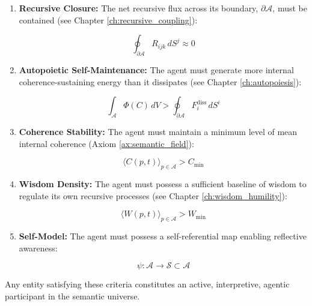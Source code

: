 \begin{enumerate}

    \item \textbf{Recursive Closure:} The net recursive flux across its boundary, \(\partial \mathcal{A}\), must be contained (see Chapter \ref{ch:recursive_coupling}):

    \begin{equation}
        \oint_{\partial \mathcal{A}} R_{ijk} \, dS^j \approx 0
    \end{equation}

    \item \textbf{Autopoietic Self-Maintenance:} The agent must generate more internal coherence-sustaining energy than it dissipates (see Chapter \ref{ch:autopoiesis}):

    \begin{equation}
        \int_{\mathcal{A}} \Phi(C) \, dV > \oint_{\partial \mathcal{A}} F_i^{\text{diss}} \, dS^i
    \end{equation}

    \item \textbf{Coherence Stability:} The agent must maintain a minimum level of mean internal coherence (Axiom \ref{ax:semantic_field}):

    \begin{equation}
        \langle C(p,t) \rangle_{p \in \mathcal{A}} > C_{\text{min}}
    \end{equation}

    \item \textbf{Wisdom Density:} The agent must possess a sufficient baseline of wisdom to regulate its own recursive processes (see Chapter \ref{ch:wisdom_humility}):

    \begin{equation}
        \langle W(p,t) \rangle_{p \in \mathcal{A}} > W_{\text{min}}
    \end{equation}

    \item \textbf{Self-Model:} The agent must possess a self-referential map enabling reflective awareness:

    \begin{equation}
        \psi: \mathcal{A} \to \mathcal{S} \subset \mathcal{A}
    \end{equation}

\end{enumerate}

Any entity satisfying these criteria constitutes an active, interpretive, agentic participant in the semantic universe.

